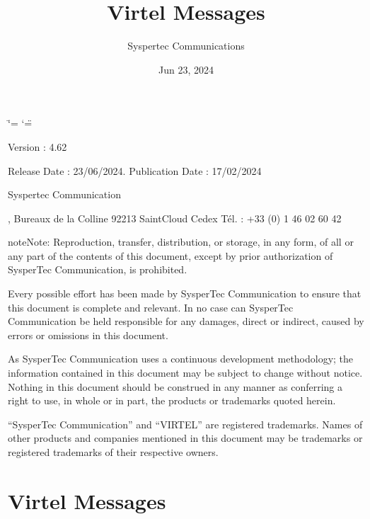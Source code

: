 \documentclass[letterpaper,10pt,english]{sphinxmanual}
\title{Virtel Messages}
\date{Jun 23, 2024}
\author{Syspertec Communications}
\begin{document}
\ifdefined\shorthandoff
  \ifnum\catcode`\=\string=\active\shorthandoff{=}\fi
  \ifnum\catcode`\"=\active{}\fi
\fi

\pagestyle{empty}
\sphinxmaketitle
\pagestyle{plain}
\sphinxtableofcontents
\pagestyle{normal}
\label{\detokenize{messages::doc}}


\sphinxAtStartPar
{}

\sphinxAtStartPar
{}

\sphinxAtStartPar
Version : 4.62

\sphinxAtStartPar
Release Date : 23/06/2024. Publication Date : 17/02/2024

\sphinxAtStartPar
Syspertec Communication

, Bureaux de la Colline 92213 Saint\sphinxhyphen{}Cloud Cedex Tél. : +33 (0) 1 46 02 60 42

\sphinxAtStartPar
{}

\begin{sphinxadmonition}{note}{Note:}
\sphinxAtStartPar
Reproduction, transfer, distribution, or storage, in any form, of all or any part of
the contents of this document, except by prior authorization of SysperTec
Communication, is prohibited.

\sphinxAtStartPar
Every possible effort has been made by SysperTec Communication to ensure that this document
is complete and relevant. In no case can SysperTec Communication be held responsible for
any damages, direct or indirect, caused by errors or omissions in this document.

\sphinxAtStartPar
As SysperTec Communication uses a continuous development methodology; the information
contained in this document may be subject to change without notice. Nothing in this
document should be construed in any manner as conferring a right to use, in whole or in
part, the products or trademarks quoted herein.

\sphinxAtStartPar
“SysperTec Communication” and “VIRTEL” are registered trademarks. Names of other products
and companies mentioned in this document may be trademarks or registered trademarks of
their respective owners.
\end{sphinxadmonition}


\chapter{Virtel Messages}
\label{\detokenize{messages:virtel-messages}}\label{\detokenize{messages:v462mg-introduction}}
\end{document}
